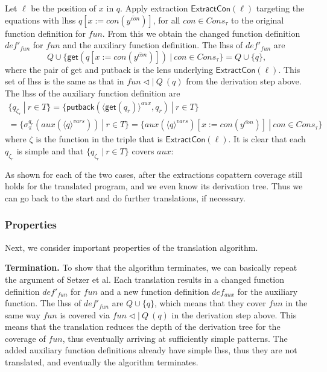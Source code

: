 \begin{algorithm}
\begin{enumerate}
Let $\ell$ be the position of $x$ in $q$. Apply extraction $\textsf{ExtractCon}(\ell)$ targeting the equations with lhss $q[x := con(\overline{y^{con}})]$, for all $con \in Cons_\tau$ to the original function definition for $fun$. From this we obtain the changed function definition $def'_{fun}$ for $fun$ and the auxiliary function definition. The lhss of $def'_{fun}$ are
\[
Q \cup \{ \textsf{get}(q[x := con(\overline{y^{con}})]) ~ | ~ con \in Cons_\tau \} = Q \cup \{q\},
\]
where the pair of \textsf{get} and \textsf{putback} is the lens underlying $\textsf{ExtractCon}(\ell)$. This set of lhss is the same as that in $fun \lhd | ~ Q ~ (q)$ from the derivation step above. The lhss of the auxiliary function definition are
\begin{multline*}
\{ q_{\zeta_r} ~ | ~ r \in T \} = \{ \textsf{putback}(\langle \textsf{get}(q_r) \rangle^{aux}, q_r) ~ | ~ r \in T \} \\
= \{ \sigma^{q_r}_\pi(aux(\langle q \rangle^{vars})) ~ | ~ r \in T \} = \{ aux(\langle q \rangle^{vars})[x := con(\overline{y^{con}})] ~ | ~ con \in Cons_\tau \}
\end{multline*}
where $\zeta$ is the function in the triple that is $\textsf{ExtractCon}(\ell)$. It is clear that each $q_{\zeta_r}$ is simple and that $\{ q_{\zeta_r} ~ | ~ r \in T \}$ covers $aux$:
\begin{prooftree}
\AxiomC{}
\end{prooftree}
\end{enumerate}

As shown for each of the two cases, after the extractions copattern coverage still holds for the translated program, and we even know its derivation tree. Thus we can go back to the start and do further translations, if necessary.
\end{algorithm}

\subsubsection{Properties}

Next, we consider important properties of the translation algorithm.

\textbf{Termination.} To show that the algorithm terminates, we can basically repeat the argument of Setzer et al. Each translation results in a changed function definition $def'_{fun}$ for $fun$ and a new function definition $def_{aux}$ for the auxiliary function. The lhss of $def'_{fun}$ are $Q \cup \{q\}$, which means that they cover $fun$ in the same way $fun$ is covered via $fun \lhd | ~ Q ~ (q)$ in the derivation step above. This means that the translation reduces the depth of the derivation tree for the coverage of $fun$, thus eventually arriving at sufficiently simple patterns. The added auxiliary function definitions already have simple lhss, thus they are not translated, and eventually the algorithm terminates.

